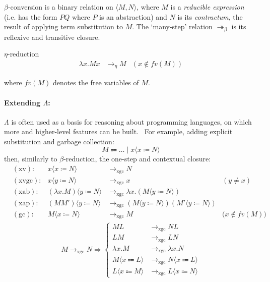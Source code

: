 $\beta$-conversion is a binary relation on $\langle{M,N}\rangle$, where $M$ is a \emph{reducible expression} (i.e. has the form $PQ$ where $P$ is an abstraction) and $N$ is its \emph{contractum}, the result of applying term substitution to $M$. The `many-step' relation $\twoheadrightarrow_{\beta}$ is its reflexive and transitive closure. \cite{tsfpl}

\begin{defn}$\eta$-reduction\label{def:types:eta-reduction}
	$$
	\begin{aligned}
	\lambda{x}.Mx &\to_{\eta} M &(x\notin{fv(M)})
	\end{aligned}
	$$
\end{defn} where $fv(M)$ denotes the free variables of $M$.

\paragraph{Extending $\Lambda$:}\label{bg:types:extending-lambda}

$\Lambda$ is often used as a basis for reasoning about programming languages, on which more and higher-level features can be built.~\cite{tpl} For example, adding explicit substitution and garbage collection: $$
M \Coloneqq \dots \mid x\langle{x \coloneqq N}\rangle
$$ then, similarly to $\beta$-reduction, the one-step and contextual closure:~\cite{lambda_xgc, tsfpl}
$$
\begin{aligned}
	&(\textrm{xv})\colon &x\langle{x \coloneqq N}\rangle &\to_{\textrm{xgc}} N \\
	&(\textrm{xvgc})\colon &x\langle{y \coloneqq N}\rangle &\to_{\textrm{xgc}} x &(y \neq x) \\
	&(\textrm{xab})\colon &(\lambda{x}.M)\langle{y \coloneqq N}\rangle &\to_{\textrm{xgc}} \lambda{x}.(M\langle{y \coloneqq N}\rangle) \\
	&(\textrm{xap})\colon &(MM')\langle{y \coloneqq N}\rangle &\to_{\textrm{xgc}} (M\langle{y \coloneqq N}\rangle)(M'\langle{y \coloneqq N}\rangle) \\
	&(\textrm{gc})\colon &M\langle{x \coloneqq N}\rangle &\to_{\textrm{xgc}} M &\big(x \notin fv(M)\big)
\end{aligned}
$$$$
\begin{aligned}
	M \to_{\textrm{xgc}} N \Rightarrow \begin{cases}
		ML &\to_{\textrm{xgc}} NL \\
		LM &\to_{\textrm{xgc}} LN \\
		\lambda{x}.M &\to_{\textrm{xgc}} \lambda{x}.N \\
		M\langle{x \Coloneqq L}\rangle &\to_{\textrm{xgc}} N\langle{x \Coloneqq L}\rangle \\
		L\langle{x \Coloneqq M}\rangle &\to_{\textrm{xgc}} L\langle{x \Coloneqq N}\rangle
	\end{cases}
\end{aligned}
$$

